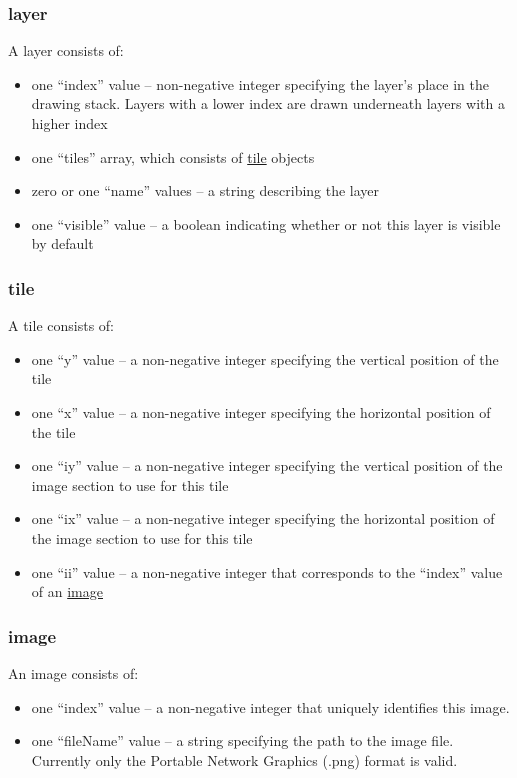 \documentclass[12pt,letterpaper]{article}
\begin{document}
\subsubsection*{layer}
\label{sec:layer}
A layer consists of:
\begin{itemize}
	\item one ``index'' value -- non-negative integer specifying the
		layer's place in the drawing stack. Layers with a lower index are drawn
		underneath layers with a higher index
	\item one ``tiles'' array, which consists of \hyperref[sec:tile]{tile} objects
	\item zero or one ``name'' values -- a string describing the layer
	\item one ``visible'' value -- a boolean indicating whether or not this layer
		is visible by default
\end{itemize}

\subsubsection*{tile}
\label{sec:tile}
A tile consists of:
\begin{itemize}
	\item one ``y'' value -- a non-negative integer specifying the vertical
		position of the tile
	\item one ``x'' value -- a non-negative integer specifying the horizontal
		position of the tile
	\item one ``iy'' value -- a non-negative integer specifying the vertical
		position of the image section to use for this tile
	\item one ``ix'' value -- a non-negative integer specifying the horizontal
		position of the image section to use for this tile
	\item one ``ii'' value -- a non-negative integer that corresponds to the
		``index'' value of an \hyperref[sec:image]{image}
\end{itemize}

\subsubsection*{image}
\label{sec:image}
An image consists of:
\begin{itemize}
	\item one ``index'' value -- a non-negative integer that uniquely identifies this
		image.
	\item one ``fileName'' value -- a string specifying the path to the image
		file. Currently only the Portable Network Graphics (.png) format is
		valid.
\end{itemize}
\end{document}
